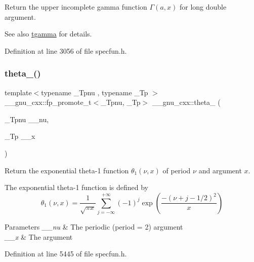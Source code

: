 Return the upper incomplete gamma function $ \Gamma(a,x) $ for {\ttfamily long double} argument.

\begin{DoxySeeAlso}{See also}
\hyperlink{group__gnu__math__spec__func_ga73a634663e4eceb1e6bcf3fc16773b7b}{tgamma} for details. 
\end{DoxySeeAlso}


Definition at line 3056 of file specfun.\+h.

\mbox{\label{group__gnu__math__spec__func_gaa2e5a3a5f550fe032a596a8b01c878c0}} 
\subsubsection{\texorpdfstring{theta\+\_()}{theta\_1()}}
{\footnotesize\ttfamily template$<$typename \+\_\+\+Tpnu , typename \+\_\+\+Tp $>$ \\
\+\_\+\+\_\+gnu\+\_\+cxx\+::fp\+\_\+promote\+\_\+t$<$\+\_\+\+Tpnu, \+\_\+\+Tp$>$ \+\_\+\+\_\+gnu\+\_\+cxx\+::theta\+\_ (\begin{DoxyParamCaption}\item[{\+\_\+\+Tpnu}]{\+\_\+\+\_\+nu,  }\item[{\+\_\+\+Tp}]{\+\_\+\+\_\+x }\end{DoxyParamCaption})\hspace{0.3cm}{\ttfamily [inline]}}

Return the exponential theta-\/1 function $ \theta_1(\nu,x) $ of period $ \nu $ and argument $ x $.

The exponential theta-\/1 function is defined by \[ \theta_1(\nu,x) = \frac{1}{\sqrt{\pi x}} \sum_{j=-\infty}^{+\infty} (-1)^j \exp\left( \frac{-(\nu + j - 1/2)^2}{x} \right) \]


\begin{DoxyParams}{Parameters}
{\em \+\_\+\+\_\+nu} & The periodic (period = 2) argument \\
\hline
{\em \+\_\+\+\_\+x} & The argument \\
\hline
\end{DoxyParams}


Definition at line 5445 of file specfun.\+h.

\mbox{\label{group__gnu__math__spec__func_ga5bbf256b875da28132f9049f5984cb14}} 
